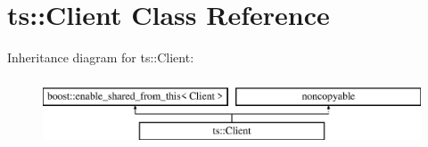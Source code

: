 \hypertarget{classts_1_1_client}{}\section{ts\+:\+:Client Class Reference}
\label{classts_1_1_client}
Inheritance diagram for ts\+:\+:Client\+:\begin{figure}[H]
\begin{center}
\leavevmode
\includegraphics[height=2.000000cm]{classts_1_1_client}
\end{center}
\end{figure}
